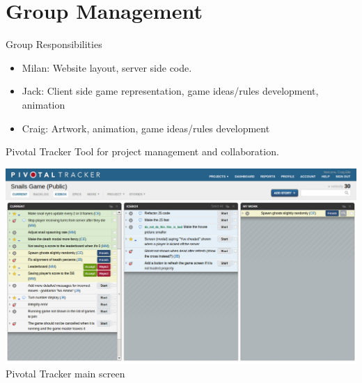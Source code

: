\documentclass{beamer}
\begin{document}
\section{Group Management}

\begin{frame}{Group Responsibilities}
  \begin{itemize}
    \item Milan: Website layout, server side code.
    \item Jack: Client side game representation, game ideas/rules development, animation
    \item Craig: Artwork, animation, game ideas/rules development
  \end{itemize}
\end{frame}

\begin{frame}{Pivotal Tracker}
  Tool for project management and collaboration. \\ 
  \begin{center}
    \includegraphics[scale=0.25]{pivotal.png} \\
    Pivotal Tracker main screen
  \end{center}
\end{frame}
\end{document}
